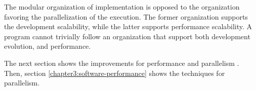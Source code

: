 











The modular organization of implementation is opposed to the organization favoring the parallelization of the execution.
The former organization supports the development scalability, while the latter supports performance scalability.
A program cannot trivially follow an organization that support both development evolution, and performance.

The next section shows the improvements for performance and parallelism .
Then, section \ref{chapter3:software-performance} shows the techniques for parallelism.

